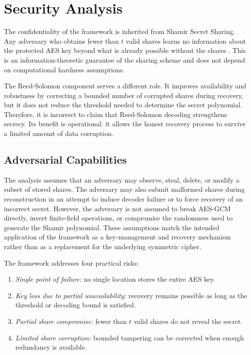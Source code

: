 \section{Security Analysis}

The confidentiality of the framework is inherited from Shamir Secret Sharing. Any adversary who obtains fewer than $t$ valid shares learns no information about the protected AES key beyond what is already possible without the shares \cite{shamir1979}. This is an information-theoretic guarantee of the sharing scheme and does not depend on computational hardness assumptions.

The Reed-Solomon component serves a different role. It improves availability and robustness by correcting a bounded number of corrupted shares during recovery, but it does not reduce the threshold needed to determine the secret polynomial. Therefore, it is incorrect to claim that Reed-Solomon decoding strengthens secrecy. Its benefit is operational: it allows the honest recovery process to survive a limited amount of data corruption.

\subsection{Adversarial Capabilities}

The analysis assumes that an adversary may observe, steal, delete, or modify a subset of stored shares. The adversary may also submit malformed shares during reconstruction in an attempt to induce decoder failure or to force recovery of an incorrect secret. However, the adversary is not assumed to break AES-GCM directly, invert finite-field operations, or compromise the randomness used to generate the Shamir polynomial. These assumptions match the intended application of the framework as a key-management and recovery mechanism rather than as a replacement for the underlying symmetric cipher.

The framework addresses four practical risks:
\begin{enumerate}
\item \textit{Single point of failure:} no single location stores the entire AES key.
\item \textit{Key loss due to partial unavailability:} recovery remains possible as long as the threshold or decoding bound is satisfied.
\item \textit{Partial share compromise:} fewer than $t$ valid shares do not reveal the secret.
\item \textit{Limited share corruption:} bounded tampering can be corrected when enough redundancy is available.
\end{enumerate}

